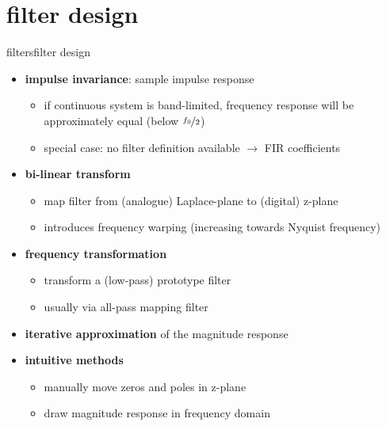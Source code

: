     \section{filter design}
		\begin{frame}{filters}{filter design}
            \vspace{-3mm}
            \begin{itemize}
                \item   \textbf{impulse invariance}: sample impulse response
                    \begin{itemize}
                        \item   if continuous system is band-limited, frequency response will be approximately equal (below $\nicefrac{f_\mathrm{S}}{2}$)
                        \item   special case: no filter definition available $\rightarrow$ FIR coefficients 
                    \end{itemize}
                \pause
                \item   \textbf{bi-linear transform}
                    \begin{itemize}
                        \item   map filter from (analogue) Laplace-plane to (digital) z-plane
                        \item   introduces frequency warping (increasing towards Nyquist frequency)
                    \end{itemize}
                \pause
                \item   \textbf{frequency transformation}
                    \begin{itemize}
                        \item   transform a (low-pass) prototype filter
                        \item   usually via all-pass mapping filter
                    \end{itemize}
                \pause
                \item   \textbf{iterative approximation} of the magnitude response
                \pause
                \item   \textbf{intuitive methods}
                    \begin{itemize}
                        \item   manually move zeros and poles in z-plane
                        \item   draw magnitude response in frequency domain
                    \end{itemize}
            \end{itemize}
 		\end{frame}

